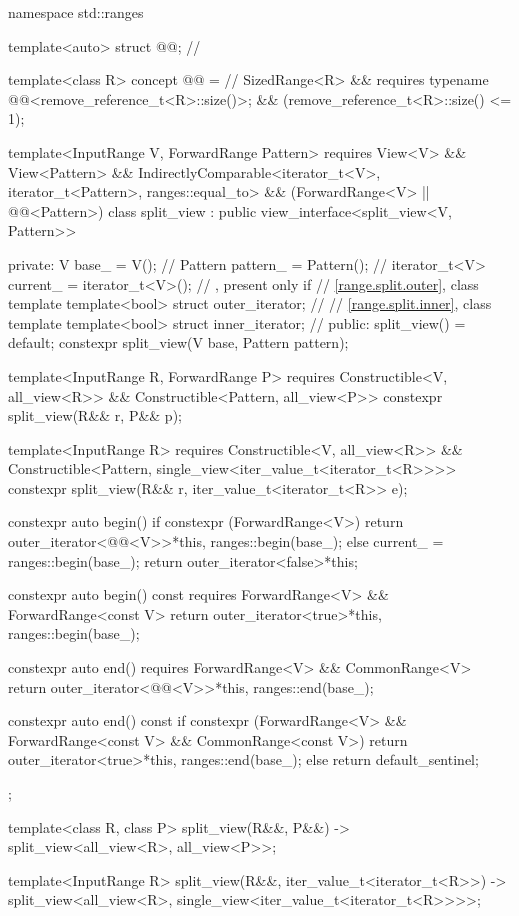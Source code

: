 \begin{codeblock}
namespace std::ranges {
  template<auto> struct @@;       // \expos

  template<class R>
  concept @@ =                          // \expos
    SizedRange<R> &&
    requires { typename @@<remove_reference_t<R>::size()>; } &&
    (remove_reference_t<R>::size() <= 1);

  template<InputRange V, ForwardRange Pattern>
    requires View<V> && View<Pattern> &&
             IndirectlyComparable<iterator_t<V>, iterator_t<Pattern>, ranges::equal_to> &&
             (ForwardRange<V> || @@<Pattern>)
  class split_view : public view_interface<split_view<V, Pattern>> {
  private:
    V base_ = V();                              // \expos
    Pattern pattern_ = Pattern();               // \expos
    iterator_t<V> current_ = iterator_t<V>();   // \expos, present only if 
    // \ref{range.split.outer}, class template 
    template<bool> struct outer_iterator;       // \expos
    // \ref{range.split.inner}, class template 
    template<bool> struct inner_iterator;       // \expos
  public:
    split_view() = default;
    constexpr split_view(V base, Pattern pattern);

    template<InputRange R, ForwardRange P>
      requires Constructible<V, all_view<R>> &&
               Constructible<Pattern, all_view<P>>
    constexpr split_view(R&& r, P&& p);

    template<InputRange R>
      requires Constructible<V, all_view<R>> &&
               Constructible<Pattern, single_view<iter_value_t<iterator_t<R>>>>
    constexpr split_view(R&& r, iter_value_t<iterator_t<R>> e);

    constexpr auto begin() {
      if constexpr (ForwardRange<V>)
        return outer_iterator<@@<V>>{*this, ranges::begin(base_)};
      else {
        current_ = ranges::begin(base_);
        return outer_iterator<false>{*this};
      }
    }

    constexpr auto begin() const requires ForwardRange<V> && ForwardRange<const V> {
      return outer_iterator<true>{*this, ranges::begin(base_)};
    }

    constexpr auto end() requires ForwardRange<V> && CommonRange<V> {
      return outer_iterator<@@<V>>{*this, ranges::end(base_)};
    }

    constexpr auto end() const {
      if constexpr (ForwardRange<V> && ForwardRange<const V> && CommonRange<const V>)
        return outer_iterator<true>{*this, ranges::end(base_)};
      else
        return default_sentinel;
    }
  };

  template<class R, class P>
    split_view(R&&, P&&) -> split_view<all_view<R>, all_view<P>>;

  template<InputRange R>
    split_view(R&&, iter_value_t<iterator_t<R>>)
      -> split_view<all_view<R>, single_view<iter_value_t<iterator_t<R>>>>;
}
\end{codeblock}

